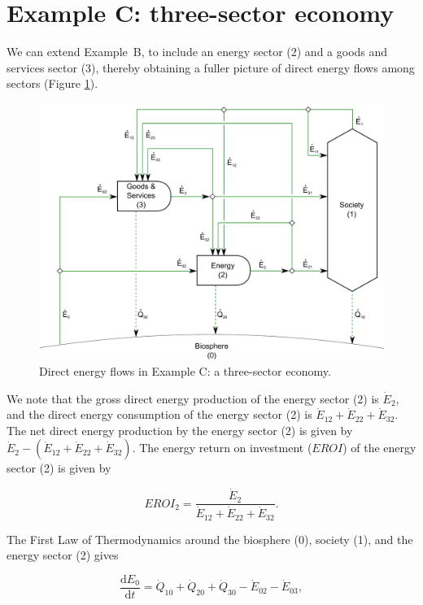 \section{Example C: three-sector economy}
\label{sec:C_energy}

We can extend Example~B, to include an energy sector (2) 
and a goods and services sector (3), thereby obtaining
a fuller picture of direct energy flows among sectors
(Figure \ref{fig:C_energy}).

\begin{figure}[h!]
\centering
\includegraphics[width=0.8\linewidth]{Part_2/Chapter_Energy/images/3_sector_direct_energy.pdf}
\caption{Direct energy flows in Example C: a three-sector economy.}
\label{fig:C_energy}
\end{figure}

We note that the gross direct energy production of the energy sector (2) is 
$\dot{E}_{2}$, and the direct energy consumption of the energy sector (2) is 
$\dot{E}_{12} + \dot{E}_{22} + \dot{E}_{32}$. 
The net direct energy production by the energy sector (2)
is given by $\dot{E}_{2} - (\dot{E}_{12} + \dot{E}_{22} + \dot{E}_{32})$.
The energy return on investment 
($EROI$) of the energy sector (2) is given by

\begin{equation} \label{eq:C-EROI}
	EROI_2 
	= \frac{\dot{E}_{2}}{\dot{E}_{12} + \dot{E}_{22} + \dot{E}_{32}}.
\end{equation}

The First Law of Thermodynamics around the 
biosphere (0), society (1), and the energy sector (2) gives

\begin{equation} \label{eq:C-CV_E_dot_0}
	\frac{\mathrm{d}E_{0}}{\mathrm{d}t} 	 
	= \dot{Q}_{10} 
	+ \dot{Q}_{20} 
	+ \dot{Q}_{30} 
	- \dot{E}_{02} 
	- \dot{E}_{03},
\end{equation}

